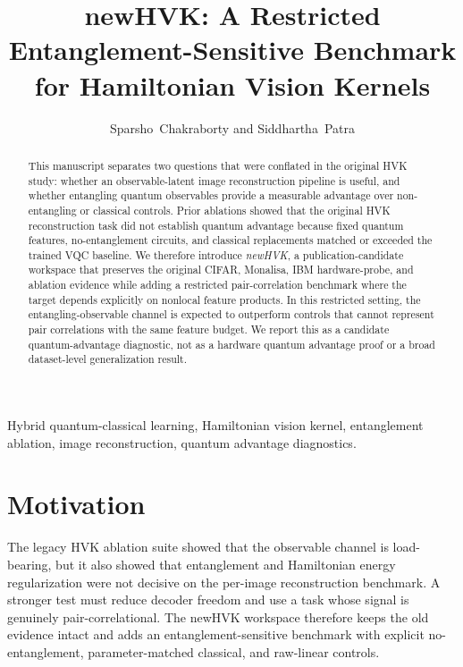\documentclass[journal]{IEEEtran}
\begin{document}
\title{newHVK: A Restricted Entanglement-Sensitive Benchmark for Hamiltonian Vision Kernels}
\author{Sparsho~Chakraborty and Siddhartha~Patra}
\maketitle
\begin{abstract}
This manuscript separates two questions that were conflated in the original HVK study: whether an observable-latent image reconstruction pipeline is useful, and whether entangling quantum observables provide a measurable advantage over non-entangling or classical controls. Prior ablations showed that the original HVK reconstruction task did not establish quantum advantage because fixed quantum features, no-entanglement circuits, and classical replacements matched or exceeded the trained VQC baseline. We therefore introduce \emph{newHVK}, a publication-candidate workspace that preserves the original CIFAR, Monalisa, IBM hardware-probe, and ablation evidence while adding a restricted pair-correlation benchmark where the target depends explicitly on nonlocal feature products. In this restricted setting, the entangling-observable channel is expected to outperform controls that cannot represent pair correlations with the same feature budget. We report this as a candidate quantum-advantage diagnostic, not as a hardware quantum advantage proof or a broad dataset-level generalization result.
\end{abstract}

\begin{IEEEkeywords}
Hybrid quantum-classical learning, Hamiltonian vision kernel, entanglement ablation, image reconstruction, quantum advantage diagnostics.
\end{IEEEkeywords}

\section{Motivation}
The legacy HVK ablation suite showed that the observable channel is load-bearing, but it also showed that entanglement and Hamiltonian energy regularization were not decisive on the per-image reconstruction benchmark. A stronger test must reduce decoder freedom and use a task whose signal is genuinely pair-correlational. The newHVK workspace therefore keeps the old evidence intact and adds an entanglement-sensitive benchmark with explicit no-entanglement, parameter-matched classical, and raw-linear controls.
\end{document}

